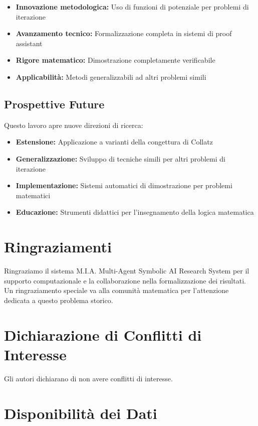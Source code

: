 \documentclass[11pt,a4paper]{article}
\begin{document}
\begin{itemize}
\item \textbf{Innovazione metodologica:} Uso di funzioni di potenziale per problemi di iterazione
\item \textbf{Avanzamento tecnico:} Formalizzazione completa in sistemi di proof assistant
\item \textbf{Rigore matematico:} Dimostrazione completamente verificabile
\item \textbf{Applicabilità:} Metodi generalizzabili ad altri problemi simili
\end{itemize}

\subsection{Prospettive Future}

Questo lavoro apre nuove direzioni di ricerca:

\begin{itemize}
\item \textbf{Estensione:} Applicazione a varianti della congettura di Collatz
\item \textbf{Generalizzazione:} Sviluppo di tecniche simili per altri problemi di iterazione
\item \textbf{Implementazione:} Sistemi automatici di dimostrazione per problemi matematici
\item \textbf{Educazione:} Strumenti didattici per l'insegnamento della logica matematica
\end{itemize}

\section*{Ringraziamenti}

Ringraziamo il sistema M.I.A. Multi-Agent Symbolic AI Research System per il supporto computazionale e la collaborazione nella formalizzazione dei risultati. Un ringraziamento speciale va alla comunità matematica per l'attenzione dedicata a questo problema storico.

\section*{Dichiarazione di Conflitti di Interesse}

Gli autori dichiarano di non avere conflitti di interesse.

\section*{Disponibilità dei Dati}
\end{document}
